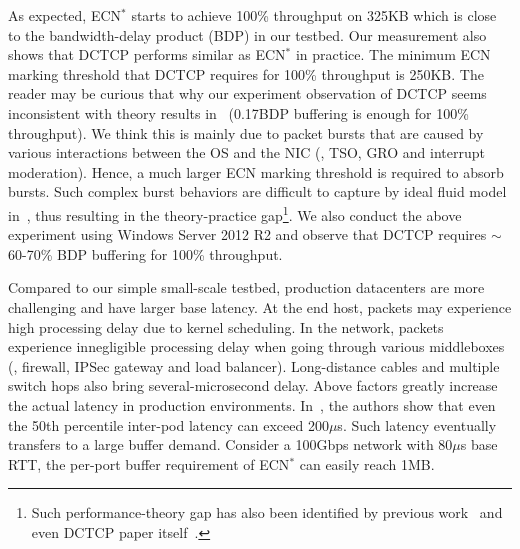 As expected, ECN$^{*}$ starts to achieve 100\% throughput on 325KB which is close to the bandwidth-delay product (BDP) in our testbed. Our measurement also shows that DCTCP performs similar as ECN$^{*}$ in practice. The minimum ECN marking threshold that DCTCP requires for 100\% throughput is 250KB. The reader may be curious that why our experiment observation of DCTCP seems inconsistent with theory results in~\cite{dctcp-analysis} (0.17BDP buffering is enough for 100\% throughput). We think this is mainly due to packet bursts that are caused by various interactions between the OS and the NIC (\eg, TSO, GRO and interrupt moderation). Hence, a much larger ECN marking threshold is required to absorb bursts. Such complex burst behaviors are difficult to capture by ideal fluid model in~\cite{dctcp-analysis}, thus resulting in the theory-practice gap\footnote{Such performance-theory gap has also been identified by previous work~\cite{tuning} and even DCTCP paper itself~\cite{dctcp}.}. We also conduct the above experiment using Windows Server 2012 R2 and observe that DCTCP requires $\sim$60-70\% BDP buffering for 100\% throughput.

\vspace{-1mm}
Compared to our simple small-scale testbed, production datacenters are more challenging and have larger base latency. At the end host, packets may experience high processing delay due to kernel scheduling. In the network, packets experience innegligible processing delay when going through various middleboxes (\eg, firewall, IPSec gateway and load balancer). Long-distance cables and multiple switch hops also bring several-microsecond delay. Above factors greatly increase the actual latency in production environments. In~\cite{pingmesh}, the authors show that even the 50th percentile inter-pod latency can exceed 200$\mu$s. Such latency eventually transfers to a large buffer demand. Consider a 100Gbps network with 80$\mu$s base RTT, the per-port buffer requirement of ECN$^{*}$ can easily reach 1MB.

